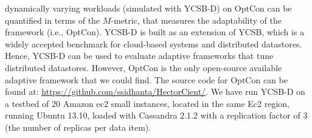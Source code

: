\documentclass{vldb}
\begin{document}
 dynamically varying workloads (simulated with YCSB-D) on OptCon can be quantified in terms of the $M$-metric, that measures the adaptability of the framework (i.e., OptCon). YCSB-D is built as an extension of YCSB, which is a widely accepted
 benchmark for cloud-based systems and distributed datastores. Hence, YCSB-D can be used to evaluate adaptive
 frameworks that tune distributed datastores. However, OptCon is the only open-source available adaptive framework that we could find.   %
 The source code  for OptCon can be found at: \url{https://github.com/ssidhanta/HectorCient/}.
 We have run  YCSB-D on a testbed of 20 Amazon ec2 small
instances, located in the same Ec2 region, running Ubuntu 13.10, loaded with Cassandra 2.1.2 %
 with a replication factor of 3 (the number of replicas per data item).
\end{document}
